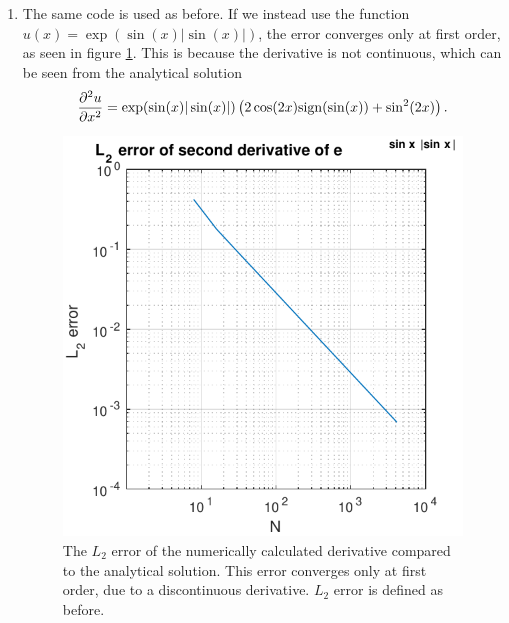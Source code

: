 \documentclass{article}
\begin{document}
\begin{enumerate}
\item
The same code is used as before.
If we instead use the function $u(x) = \exp(\sin(x) |\sin(x)|)$, the error converges only at first order, as seen in figure \ref{fig:p2abs}.
This is because the derivative is not continuous, which can be seen from the analytical solution
\begin{align}
\frac{\partial^{2} u}{ \partial x^{2}} = \exp(\sin(x) |\sin(x)|) \left( 2 \cos(2 x) \mathrm{sign}(\sin(x)) + \sin^2(2 x) \right).
\end{align}
\begin{figure}[!ht]
\centering
\includegraphics[scale=1]{p2errabs.pdf}
\caption{The $L_2$ error of the numerically calculated derivative compared to the analytical solution. This error converges only at first order, due to a discontinuous derivative. $L_2$ error is defined as before.}
\label{fig:p2abs}
\end{figure}
\end{enumerate}
\end{document}

